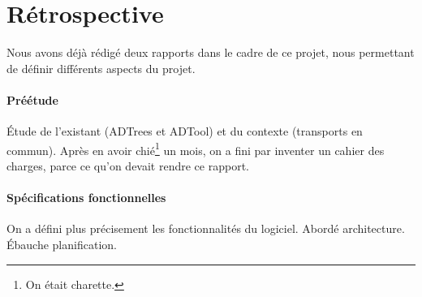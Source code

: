 \section{Rétrospective}
	\label{sec:retrospective}

	Nous avons déjà rédigé deux rapports dans le cadre de ce projet, nous permettant de définir différents aspects du projet.

	\paragraph{Préétude}  \'Etude de l'existant (ADTrees et ADTool) et du contexte (transports en commun). Après en avoir chié\footnote{On était charette.} un mois, on a fini par inventer un cahier des charges, parce ce qu'on devait rendre ce rapport.

	\paragraph{Spécifications fonctionnelles}  On a défini plus précisement les fonctionnalités du logiciel. Abordé architecture. \'Ebauche planification.